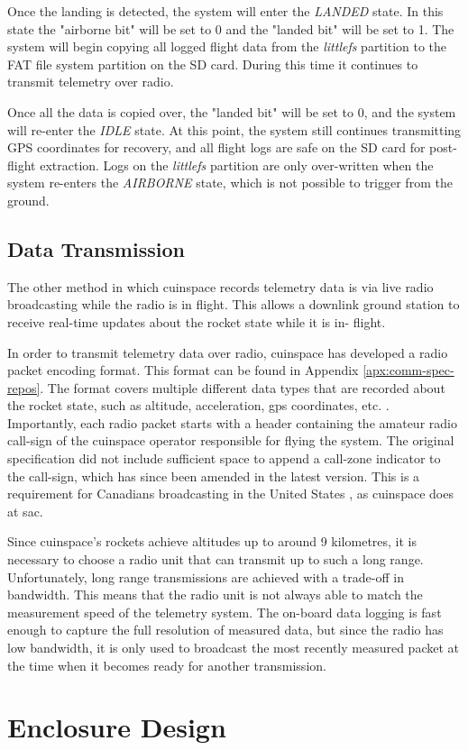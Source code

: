 Once the landing is detected, the system will enter the \textit{LANDED} state. In this state the "airborne bit" will be
set to 0 and the "landed bit" will be set to 1. The system will begin copying all logged flight data from the
\textit{littlefs} partition to the FAT file system partition on the SD card. During this time it continues to transmit
telemetry over radio.

Once all the data is copied over, the "landed bit" will be set to 0, and the system will re-enter the \textit{IDLE}
state. At this point, the system still continues transmitting GPS coordinates for recovery, and all flight logs are
safe on the SD card for post-flight extraction. Logs on the \textit{littlefs} partition are only over-written when the
system re-enters the \textit{AIRBORNE} state, which is not possible to trigger from the ground.

\subsection{Data Transmission}

The other method in which \gls{cuinspace} records telemetry data is via live radio broadcasting while the radio is in
flight. This allows a downlink ground station to receive real-time updates about the rocket state while it is in-
flight.

In order to transmit telemetry data over radio, \gls{cuinspace} has developed a radio packet encoding format. This
format can be found in Appendix \ref{apx:comm-spec-repos}. The format covers multiple different data types that are
recorded about the rocket state, such as altitude, acceleration, \gls{gps} coordinates, etc. \cite{radio-comms}.
Importantly, each radio packet starts with a header containing the amateur radio call-sign of the \gls{cuinspace}
operator responsible for flying the system. \cite{radio-comms} The original specification did not include sufficient
space to append a call-zone indicator to the call-sign, which has since been amended in the latest version. This is a
requirement for Canadians broadcasting in the United States \cite{foreign-broadcast}, as \gls{cuinspace} does at
\gls{sac}.

Since \gls{cuinspace}'s rockets achieve altitudes up to around 9 kilometres, it is necessary to choose a radio unit
that can transmit up to such a long range. Unfortunately, long range transmissions are achieved with a trade-off in
bandwidth. This means that the radio unit is not always able to match the measurement speed of the telemetry system.
The on-board data logging is fast enough to capture the full resolution of measured data, but since the radio has low
bandwidth, it is only used to broadcast the most recently measured packet at the time when it becomes ready for another
transmission.

\section{Enclosure Design}

